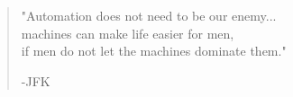 

\begin{minipage}{13cm}
	\begin{quote}
		"Automation does not need to be our enemy...\\machines can make life easier for men,\\if men do not let the machines dominate them."\begin{flushright}-JFK\end{flushright}
	\end{quote}
\end{minipage}
